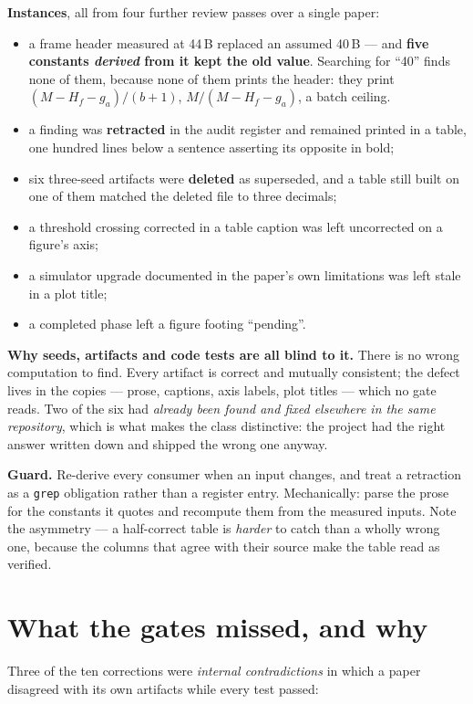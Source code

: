 \documentclass[conference]{IEEEtran}
\begin{document}
\textbf{Instances}, all from four further review passes over a single paper:
\begin{itemize}\itemsep2pt
\item a frame header measured at 44\,B replaced an assumed 40\,B --- and \textbf{five constants
\emph{derived} from it kept the old value}. Searching for ``40'' finds none of them, because none of
them prints the header: they print $(M{-}H_f{-}g_a)/(b{+}1)$, $M/(M{-}H_f{-}g_a)$, a batch ceiling.
\item a finding was \textbf{retracted} in the audit register and remained printed in a table, one
hundred lines below a sentence asserting its opposite in bold;
\item six three-seed artifacts were \textbf{deleted} as superseded, and a table still built on one
of them matched the deleted file to three decimals;
\item a threshold crossing corrected in a table caption was left uncorrected on a figure's axis;
\item a simulator upgrade documented in the paper's own limitations was left stale in a plot title;
\item a completed phase left a figure footing ``pending''.
\end{itemize}

\textbf{Why seeds, artifacts and code tests are all blind to it.} There is no wrong computation to
find. Every artifact is correct and mutually consistent; the defect lives in the copies --- prose,
captions, axis labels, plot titles --- which no gate reads. Two of the six had \emph{already been
found and fixed elsewhere in the same repository}, which is what makes the class distinctive: the
project had the right answer written down and shipped the wrong one anyway.

\textbf{Guard.} Re-derive every consumer when an input changes, and treat a retraction as a
\texttt{grep} obligation rather than a register entry. Mechanically: parse the prose for the
constants it quotes and recompute them from the measured inputs. Note the asymmetry --- a
half-correct table is \emph{harder} to catch than a wholly wrong one, because the columns that
agree with their source make the table read as verified.

\section{What the gates missed, and why}
Three of the ten corrections were \emph{internal contradictions} in which a paper disagreed with its
own artifacts while every test passed:
\end{document}
